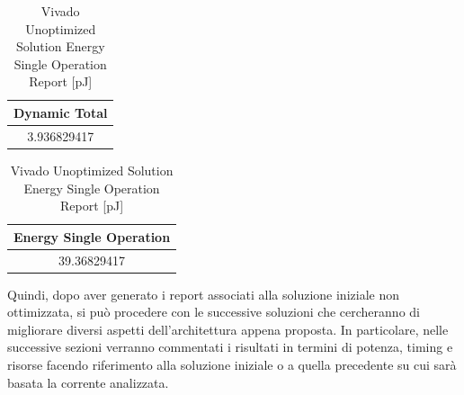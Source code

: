 \begin{table}[H]
    \centering
    \begin{minipage}[t]{0.45\linewidth}
        \centering
        \begin{tabular}{|c|}
            \hline
            \textbf{Dynamic Total} \\
            \hline
            3.936829417 \\
            \hline
        \end{tabular}
        \caption{Vivado Unoptimized Solution Dynamic Power Report [mW]}
        \label{tab:vivado-unoptimized-solution-dynamic-power-reproot}
    \end{minipage}
    \hfill
    \centering
    \begin{minipage}[t]{0.45\linewidth}
        \centering
        \begin{tabular}{|c|}
            \hline
            \textbf{Energy Single Operation} \\
            \hline
            39.36829417 \\
            \hline
        \end{tabular}
        \caption{Vivado Unoptimized Solution Energy Single Operation Report [pJ]}
        \label{tab:vivado-unoptimized-solution-energy-single-operation-reproot}
    \end{minipage}
\end{table}

Quindi, dopo aver generato i report associati alla soluzione iniziale non ottimizzata, si può procedere con le successive soluzioni che cercheranno di migliorare diversi aspetti dell'architettura appena proposta. In particolare, nelle successive sezioni verranno commentati i risultati in termini di potenza, timing e risorse facendo riferimento alla soluzione iniziale o a quella precedente su cui sarà basata la corrente analizzata.